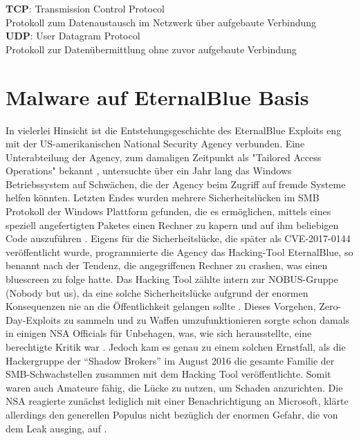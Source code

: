 \documentclass[DIV=12,headings=normal,pdftex,headinclude=false,footinclude=false,final]{scrreprt}
\begin{document}
\noindent
\textbf{TCP}: Transmission Control Protocol\\
Protokoll zum Datenaustausch im Netzwerk über aufgebaute Verbindung\\

\noindent
\textbf{UDP}: User Datagram Protocol\\
Protokoll zur Datenübermittlung ohne zuvor aufgebaute Verbindung\\


\newpage
{}




\chapter{Malware auf EternalBlue Basis}
In vielerlei Hinsicht ist die Entstehungsgeschichte des EternalBlue Exploits eng mit der US-amerikanischen National Security Agency verbunden. Eine Unterabteilung der Agency, zum damaligen Zeitpunkt als "Tailored Access Operations" bekannt \cite{CS}, untersuchte über ein Jahr lang das Windows Betriebssystem auf Schwächen, die der Agency beim Zugriff auf fremde Systeme helfen könnten\cite{WP}. Letzten Endes wurden mehrere Sicherheitslücken im SMB Protokoll der Windows Plattform gefunden, die es ermöglichen, mittels eines speziell angefertigten Paketes einen Rechner zu kapern und auf ihm beliebigen Code auszuführen \cite{Avast}.
Eigens für die Sicherheitslücke, die später als CVE-2017-0144 veröffentlicht wurde, programmierte die Agency das Hacking-Tool EternalBlue, so benannt nach der Tendenz, die angegriffenen Rechner zu crashen, was einen bluescreen zu folge hatte. Das Hacking Tool zählte intern zur NOBUS-Gruppe (Nobody but us), da eine solche Sicherheitslücke aufgrund der enormen Konsequenzen nie an die Öffentlichkeit gelangen sollte \cite{CS}. Dieses Vorgehen, Zero-Day-Exploits zu sammeln und zu Waffen umzufunktionieren sorgte schon damals in einigen NSA Officials für Unbehagen, was, wie sich herausstellte, eine berechtigte Kritik war \cite{WP}.
Jedoch kam es genau zu einem solchen Ernstfall, als die Hackergruppe der “Shadow Brokers” im August 2016 die gesamte Familie der SMB-Schwachstellen zusammen mit dem Hacking Tool veröffentlichte. Somit waren auch Amateure fähig, die Lücke zu nutzen, um Schaden anzurichten. Die NSA reagierte zunächst lediglich mit einer Benachrichtigung an Microsoft, klärte allerdings den generellen Populus nicht bezüglich der enormen Gefahr, die von dem Leak ausging, auf \cite{WP}.
\end{document}
